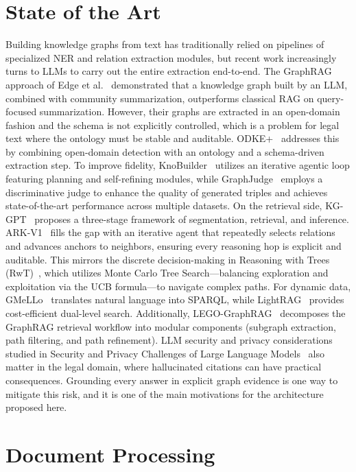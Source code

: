 \documentclass[conference]{IEEEtran}
\begin{document}
\section{State of the Art}
Building knowledge graphs from text has traditionally relied on pipelines of specialized NER and relation extraction modules, but recent work increasingly turns to LLMs to carry out the entire extraction end-to-end. The GraphRAG approach of {Edge et al.}~\cite{edge2024} demonstrated that a knowledge graph built by an LLM, combined with community summarization, outperforms classical RAG on query-focused summarization. However, their graphs are extracted in an open-domain fashion and the schema is not explicitly controlled, which is a problem for legal text where the ontology must be stable and auditable. ODKE+~\cite{odkeplus2025} addresses this by combining open-domain detection with an ontology and a schema-driven extraction step. To improve fidelity, KnoBuilder~\cite{knobuilder2025} utilizes an iterative agentic loop featuring planning and self-refining modules, while GraphJudge~\cite{graphjudge2025} employs a discriminative judge to enhance the quality of generated triples and achieves state-of-the-art performance across multiple datasets. On the retrieval side, KG-GPT~\cite{kggpt2023} proposes a three-stage framework of segmentation, retrieval, and inference. ARK-V1~\cite{arkv12025} fills the gap with an iterative agent that repeatedly selects relations and advances anchors to neighbors, ensuring every reasoning hop is explicit and auditable. This mirrors the discrete decision-making in {Reasoning with Trees (RwT)}~\cite{rwt2025}, which utilizes Monte Carlo Tree Search—balancing exploration and exploitation via the UCB formula—to navigate complex paths. For dynamic data, GMeLLo~\cite{gmello2024} translates natural language into SPARQL, while LightRAG~\cite{lightrag2024} provides cost-efficient dual-level search. Additionally, LEGO-GraphRAG~\cite{legograph2024} decomposes the GraphRAG retrieval workflow into modular components (subgraph extraction, path filtering, and path refinement). LLM security and privacy considerations studied in {Security and Privacy Challenges of Large Language Models}~\cite{das2024} also matter in the legal domain, where hallucinated citations can have practical consequences. Grounding every answer in explicit graph evidence is one way to mitigate this risk, and it is one of the main motivations for the architecture proposed here.

\section{Document Processing}
\end{document}
